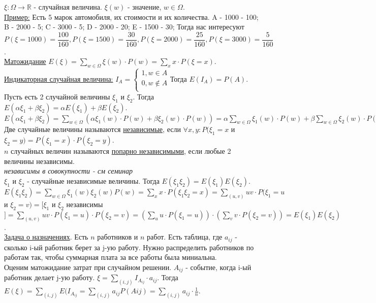 \documentclass{article}
\newcommand{\R}{\mathbb{R}}
\newcommand{\tu}[1]{\underline{#1}}
\newcommand{\ti}[1]{\textit{#1}}
\begin{document}
$ \xi : \Omega \rightarrow \R $ - случайная величина. $ \xi(w) $ - значение,  $ w \in \Omega $. \\
\tu{Пример:} Есть 5 марок автомобиля, их стоимости и их количества.
A - 1000 - 100; B - 2000 - 5; C - 3000 - 5; D - 2000  - 20; E - 1500 - 30;
Тогда нас интересуют $P(\xi = 1000) = \dfrac{100}{160}, P(\xi = 1500) = \dfrac{30}{160}, P(\xi = 2000) = \dfrac{25}{160}, P(\xi = 3000) = \dfrac{5}{160} $.\\

\tu{Матожидание} $E(\xi) = \sum_{w \in \Omega} \xi(w) \cdot P(w) = \sum_{x} x \cdot P(\xi = x) $. \\

\tu{Индикаторная случайная величина:}
$I_A = 
\begin{cases}
1, w \in A \\
0, w \notin A \\
\end{cases}
$Тогда $E(I_A) = P(A)$. \\

Пусть есть 2 случайной величины $\xi_1$ и $\xi_2$. Тогда $E(\alpha \xi_1 + \beta \xi_2) = \alpha E(\xi_1) + \beta E(\xi_2)$.\\
$E(\alpha \xi_1 + \beta \xi_2) = \sum_{w \in \Omega}(\alpha \xi_1(w) \cdot P(w) + \beta \xi_2(w) \cdot P(w)) = \alpha \sum_{w \in \Omega} \xi_1(w) \cdot P(w) + \beta \sum_{w \in \Omega} \xi_2(w) \cdot P(w) = \alpha E(\xi_1) + \beta E(\xi_2)$ \\

Две случайные величины называются \tu{независимые}, если $ \forall x, y : P(\xi_1 = x $ и $ \xi_2 = y) = P(\xi_1 = x) \cdot P(\xi_2 = y) $. \\
$n$ случайных величин называются \tu{попарно независимыми}, если любые 2 величины независимы. \\
\ti{независимы в совокупности - см семинар} \\

$\xi_1$ и $\xi_2$ - случайные независимые величины. Тогда $E(\xi_1 \xi_2) = E(\xi_1)E(\xi_2)$. \\
$E(\xi_1 \xi_2) = \sum_{w \in \Omega} \xi_1(w) \xi_2(w) P(w) = \sum_{x} x \cdot P(\xi_1 \xi_2 = x) = \sum_{(u,v)} uv \cdot P(\xi_1 = u $ и $ \xi_2 = v) = [\xi_1 $ и $ \xi_2 $ независимы$] = \sum_{(u, v)} uv \cdot P(\xi_1 = u) \cdot P(\xi_2 = v) = (\sum_{u} u \cdot P(\xi_1 = u)) \cdot (\sum_{v} v \cdot P(\xi_2 = v)) = E(\xi_1)E(\xi_2)$. \\

\tu{Задача о назначениях}. Есть $n$ работников и $n$ работ. Есть таблица, где $a_{ij}$ - сколько i-ый работник берет за j-ую работу. Нужно распределить работников по работам так, чтобы суммарная плата за все работы была миниальна. \\
Оценим матожидание затрат при случайном решении. $A_{ij}$ - событие, когда i-ый работник делает j-ую работу. $\xi = \sum_{(i,j)} I_{A_{ij}} \cdot a_{ij}$. Тогда $E(\xi) = \sum_{(i,j)} E(I_{A_{ij}} = \sum_{(i,j)} a_{ij}P(A{ij}) = \sum_{(i,j)} a_{ij} \cdot \frac{1}{n} $. \\
\end{document}
